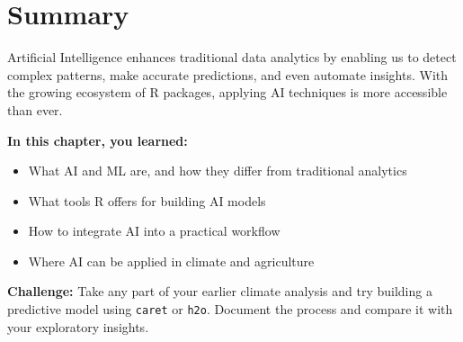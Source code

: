 \section{Summary}

Artificial Intelligence enhances traditional data analytics by enabling us to detect complex patterns, make accurate predictions, and even automate insights. With the growing ecosystem of R packages, applying AI techniques is more accessible than ever.

\textbf{In this chapter, you learned:}
\begin{itemize}
  \item What AI and ML are, and how they differ from traditional analytics
  \item What tools R offers for building AI models
  \item How to integrate AI into a practical workflow
  \item Where AI can be applied in climate and agriculture
\end{itemize}

\textbf{Challenge:} Take any part of your earlier climate analysis and try building a predictive model using \texttt{caret} or \texttt{h2o}. Document the process and compare it with your exploratory insights.
